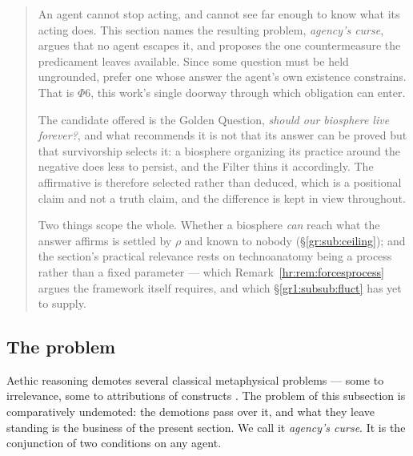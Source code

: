 \documentclass[11pt]{article}
\numberwithin{equation}{section}
\theoremstyle{plain}
\theoremstyle{definition}
\theoremstyle{remark}
\begin{document}
\begin{quote}\small
An agent cannot stop acting, and cannot see far enough to know what its
acting does. This section names the resulting problem, \emph{agency's
curse}, argues that no agent escapes it, and proposes the one
countermeasure the predicament leaves available. Since some question
must be held ungrounded, prefer one whose answer the agent's own
existence constrains. That is $\Phi6$, this work's single doorway
through which obligation can enter.

The candidate offered is the Golden Question, \emph{should our
biosphere live forever?}, and what recommends it is not that its
answer can be proved but that survivorship selects it: a biosphere
organizing its practice around the negative does less to persist, and
the Filter thins it accordingly. The affirmative is therefore selected
rather than deduced, which is a positional claim and not a truth claim,
and the difference is kept in view throughout.

Two things scope the whole. Whether a biosphere \emph{can} reach what
the answer affirms is settled by $\rho$ and known to nobody
(\S\ref{gr:sub:ceiling}); and the section's practical relevance rests on technoanatomy being a
process rather than a fixed parameter --- which
Remark~\ref{hr:rem:forcesprocess} argues the framework itself requires,
and which \S\ref{gr1:subsub:fluct} has yet to supply.
\end{quote}

\subsection{The problem}\label{ac:sub:problem}

Aethic reasoning demotes several classical metaphysical problems --- some to irrelevance, some to attributions of constructs \cite{Aethus}. The problem of this subsection is comparatively undemoted: the demotions pass over it, and what they leave standing is the business of the present section. We call it \emph{agency's curse}. It is the conjunction of two conditions on any agent.
\end{document}
